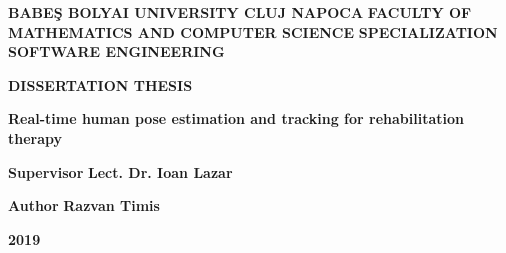 
\begin{titlepage}
\sloppy
\begin{center}
\fontsize{16}{18} \textbf{BABE\c S BOLYAI UNIVERSITY CLUJ NAPOCA}
\break \break 
\fontsize{16}{18} \textbf{FACULTY OF MATHEMATICS AND COMPUTER SCIENCE}
\break \break 
\fontsize{16}{18} \textbf{SPECIALIZATION SOFTWARE ENGINEERING}

\vspace{5cm}

\fontsize{18}{18} \textbf{DISSERTATION THESIS}

\vspace{1cm}

\fontsize{22}{18} \textbf{Real-time human pose estimation and tracking for rehabilitation therapy}

\end{center}

\vspace{5cm}

\begin{flushleft}
\fontsize{16}{18} \textbf{Supervisor} \break
\Large{\textbf{Lect. Dr. Ioan Lazar}}
\end{flushleft}

\begin{flushright}
\fontsize{16}{18} \textbf{Author} \break
\Large{\textbf{Razvan Timis}}
\end{flushright}

\vspace{3cm}

\begin{center}
\fontsize{16}{18} \textbf{2019}
\end{center}

\end{titlepage}